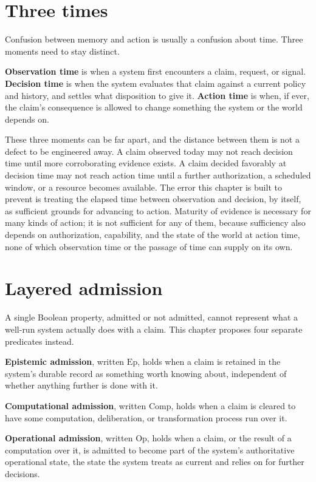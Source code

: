 \documentclass[11pt,openany]{book}
\begin{document}
\section{Three times}

Confusion between memory and action is usually a confusion about time. Three
moments need to stay distinct.

\textbf{Observation time} is when a system first encounters a claim, request,
or signal. \textbf{Decision time} is when the system evaluates that claim
against a current policy and history, and settles what disposition to give it.
\textbf{Action time} is when, if ever, the claim's consequence is allowed to
change something the system or the world depends on.

These three moments can be far apart, and the distance between them is not a
defect to be engineered away. A claim observed today may not reach decision
time until more corroborating evidence exists. A claim decided favorably at
decision time may not reach action time until a further authorization, a
scheduled window, or a resource becomes available. The error this chapter is
built to prevent is treating the elapsed time between observation and decision,
by itself, as sufficient grounds for advancing to action. Maturity of evidence
is necessary for many kinds of action; it is not sufficient for any of them,
because sufficiency also depends on authorization, capability, and the state
of the world at action time, none of which observation time or the passage of
time can supply on its own.

\section{Layered admission}

A single Boolean property, admitted or not admitted, cannot represent what a
well-run system actually does with a claim. This chapter proposes four separate
predicates instead.

\textbf{Epistemic admission}, written \(\mathrm{Ep}\), holds when a claim is
retained in the system's durable record as something worth knowing about,
independent of whether anything further is done with it.

\textbf{Computational admission}, written \(\mathrm{Comp}\), holds when a
claim is cleared to have some computation, deliberation, or transformation
process run over it.

\textbf{Operational admission}, written \(\mathrm{Op}\), holds when a claim,
or the result of a computation over it, is admitted to become part of the
system's authoritative operational state, the state the system treats as
current and relies on for further decisions.
\end{document}
